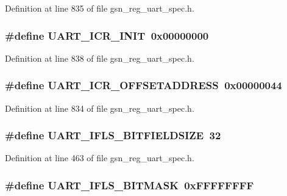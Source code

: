 Definition at line 835 of file gsn\_\-reg\_\-uart\_\-spec.h.

\hypertarget{a00575_a0c96168f3c409c6a9de43f6d2ac61fdd}{
\subsubsection[{UART\_\-ICR\_\-INIT}]{\setlength{\rightskip}{0pt plus 5cm}\#define UART\_\-ICR\_\-INIT~0x00000000}}
\label{a00575_a0c96168f3c409c6a9de43f6d2ac61fdd}


Definition at line 838 of file gsn\_\-reg\_\-uart\_\-spec.h.

\hypertarget{a00575_aa4b840d9ada45e151e2a7fc21a109b14}{
\subsubsection[{UART\_\-ICR\_\-OFFSETADDRESS}]{\setlength{\rightskip}{0pt plus 5cm}\#define UART\_\-ICR\_\-OFFSETADDRESS~0x00000044}}
\label{a00575_aa4b840d9ada45e151e2a7fc21a109b14}


Definition at line 834 of file gsn\_\-reg\_\-uart\_\-spec.h.

\hypertarget{a00575_ab8acbec8c619d8193bf9865056fce7ab}{
\subsubsection[{UART\_\-IFLS\_\-BITFIELDSIZE}]{\setlength{\rightskip}{0pt plus 5cm}\#define UART\_\-IFLS\_\-BITFIELDSIZE~32}}
\label{a00575_ab8acbec8c619d8193bf9865056fce7ab}


Definition at line 463 of file gsn\_\-reg\_\-uart\_\-spec.h.

\hypertarget{a00575_a6dca0ae60e84ad1f6cfc427ce71259db}{
\subsubsection[{UART\_\-IFLS\_\-BITMASK}]{\setlength{\rightskip}{0pt plus 5cm}\#define UART\_\-IFLS\_\-BITMASK~0xFFFFFFFF}}
\label{a00575_a6dca0ae60e84ad1f6cfc427ce71259db}


